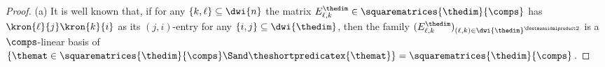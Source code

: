 \documentclass[pdftex]{sigma}
\numberwithin{equation}{section}
\begin{document}
{  \begin{proof}
    \newcommand{\matb}[3]{E^{#1}_{#2,#3}}
    \newcommand{\indi}{i}
    \newcommand{\indj}{j}
    \newcommand{\indk}{k}
    \newcommand{\indl}{\ell}
    \newcommand{\inds}{s}
    \newcommand{\indt}{t}
    \newcommand{\smalliso}[1]{\varphi_{#1}}
    \newcommand{\smallisoinv}[1]{\psi_{#1}}
    \newcommand{\auxmat}{w}
    \newcommand{\auxmatx}[2]{\auxmat_{#1,#2}}
    \newcommand{\smallmat}{u}
    \newcommand{\smallmatx}[2]{\smallmat_{#1,#2}}
    \newcommand{\thematx}[2]{\themat_{#1,#2}}
    \newcommand{\othermat}{v'}
    \newcommand{\othermatx}[2]{\othermat_{#1,#2}}
    \newcommand{\ssmatb}[3]{T^{#1}_{#2,#3}}
    \newcommand{\indset}[1]{\Gamma_{#1}}
    \newcommand{\someind}{\gamma}
    \newcommand{\basismat}[2]{B^{#1}_{#2}}
    \newcommand{\scals}[1]{a_{#1}}
(a)
It is well known that, if for any $\{\indk,\indl\}\subseteq \dwi{n}$ the matrix $\matb{\thedim}{\indl}{\indk}\in \squarematrices{\thedim}{\comps}$ has $\kron{\indl}{\indj}\kron{\indk}{\indi}$ as its $(\indj,\indi)$-entry for any $\{\indi,\indj\}\subseteq \dwi{\thedim}$, then the family $(\matb{\thedim}{\indl}{\indk})_{(\indl,\indk)\in\dwi{\thedim}^{\Ssetmonoidalproduct 2}}$ is a $\comps$-linear basis of $\{\themat\in\squarematrices{\thedim}{\comps}\Sand \theshortpredicatex{\themat}\}=\squarematrices{\thedim}{\comps}$.


\end{proof}}
\end{document}

